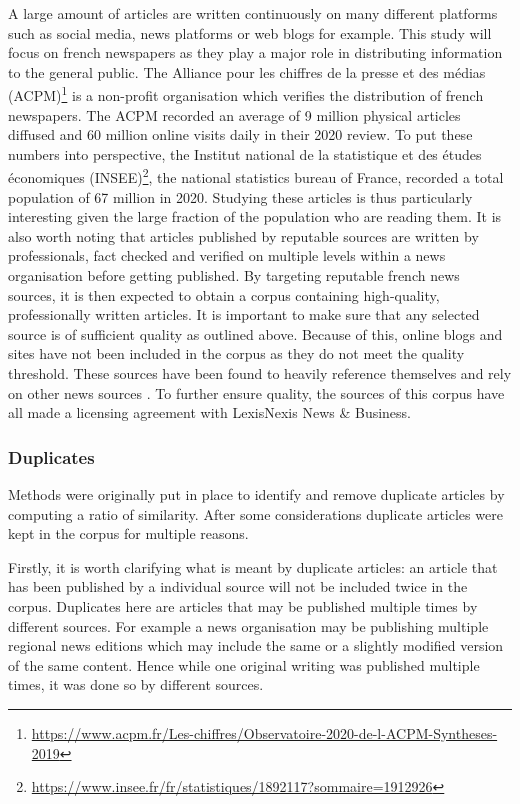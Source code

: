A large amount of articles are written continuously on many different platforms such as social media, news platforms or web blogs for example. This study will focus on french newspapers as they play a major role in distributing information to the general public. The Alliance pour les chiffres de la presse et des médias (ACPM)\footnote{\url{https://www.acpm.fr/Les-chiffres/Observatoire-2020-de-l-ACPM-Syntheses-2019}} is a non-profit organisation which verifies the distribution of french newspapers. The ACPM recorded an average of 9 million physical articles diffused and 60 million online visits daily in their 2020 review. To put these numbers into perspective, the Institut national de la statistique et des études économiques (INSEE)\footnote{\url{https://www.insee.fr/fr/statistiques/1892117?sommaire=1912926}}, the national statistics bureau of France, recorded a total population of 67 million in 2020. Studying these articles is thus particularly interesting given the large fraction of the population who are reading them. It is also worth noting that articles published by reputable sources are written by professionals, fact checked and verified on multiple levels within a news organisation before getting published. By targeting reputable french news sources, it is then expected to obtain a corpus containing high-quality, professionally written articles. It is important to make sure that any selected source is of sufficient quality as outlined above. Because of this, online blogs and sites have not been included in the corpus as they do not meet the quality threshold. These sources have been found to heavily reference themselves and rely on other news sources \cite{adamic2005political}. To further ensure quality, the sources of this corpus have all made a licensing agreement with LexisNexis News \& Business.

\subsubsection{Duplicates}

Methods were originally put in place to identify and remove duplicate articles by computing a ratio of similarity. After some considerations duplicate articles were kept in the corpus for multiple reasons.

Firstly, it is worth clarifying what is meant by duplicate articles: an article that has been published by a individual source will not be included twice in the corpus. Duplicates here are articles that may be published multiple times by different sources. For example a news organisation may be publishing multiple regional news editions which may include the same or a slightly modified version of the same content. Hence while one original writing was published multiple times, it was done so by different sources.

